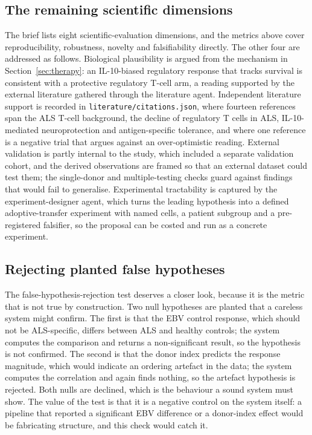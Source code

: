 \documentclass[11pt]{article}
\begin{document}
\subsection{The remaining scientific dimensions}
The brief lists eight scientific-evaluation dimensions, and the metrics above cover reproducibility,
robustness, novelty and falsifiability directly. The other four are addressed as follows.
Biological plausibility is argued from the mechanism in Section~\ref{sec:therapy}: an IL-10-biased
regulatory response that tracks survival is consistent with a protective regulatory T-cell arm, a
reading supported by the external literature gathered through the literature agent. Independent
literature support is recorded in \texttt{literature/citations.json}, where fourteen references span
the ALS T-cell background, the decline of regulatory T cells in ALS, IL-10-mediated neuroprotection
and antigen-specific tolerance, and where one reference is a negative trial that argues against an
over-optimistic reading. External validation is partly internal to the study, which included a
separate validation cohort, and the derived observations are framed so that an external dataset
could test them; the single-donor and multiple-testing checks guard against findings that would fail
to generalise. Experimental tractability is captured by the experiment-designer agent, which turns
the leading hypothesis into a defined adoptive-transfer experiment with named cells, a patient
subgroup and a pre-registered falsifier, so the proposal can be costed and run as a concrete
experiment.

\subsection{Rejecting planted false hypotheses}
The false-hypothesis-rejection test deserves a closer look, because it is the metric that is not true
by construction. Two null hypotheses are planted that a careless system might confirm. The first is
that the EBV control response, which should not be ALS-specific, differs between ALS and healthy
controls; the system computes the comparison and returns a non-significant result, so the hypothesis
is not confirmed. The second is that the donor index predicts the response magnitude, which would
indicate an ordering artefact in the data; the system computes the
correlation and again finds nothing, so the artefact hypothesis is rejected. Both nulls are declined,
which is the behaviour a sound system must show. The value of the test is that it is a negative
control on the system itself: a pipeline that reported a significant EBV difference or a donor-index
effect would be fabricating structure, and this check would catch it.
\end{document}
